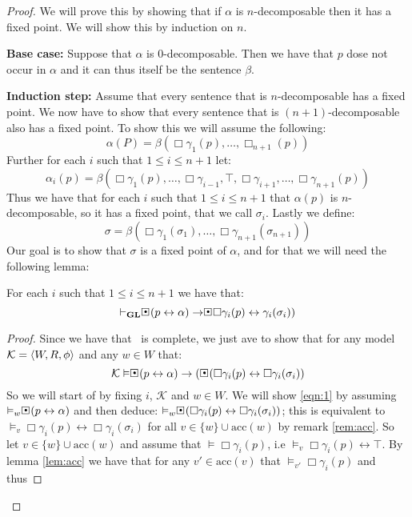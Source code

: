 \documentclass[../main.tex]{subfiles}
\begin{document}
\begin{proof}
	We will prove this by showing that if $\alpha$ is $n$-decomposable
	then it has a fixed point. We will show this by induction on $n$.

	\textbf{Base case:} Suppose that $\alpha$ is $0$-decomposable. Then we
	have that $p$ dose not occur in $\alpha$ and it can thus itself be the
	sentence $\beta$.

	\textbf{Induction step:}
	Assume that every sentence that is $n$-decomposable has a fixed point.
	We now have to show that every sentence that is $(n+1)$-decomposable
	also has a fixed point. To show this we will assume the following:
	$$\alpha(P)=\beta(\Box\gamma_1(p),\ldots,\Box_{n+1}(p))$$
	Further for each $i$ such that $1\leq i\leq n+1$ let:
	\[\alpha_i(p)=\beta(\Box\gamma_1(p),\ldots,\Box\gamma_{i-1},\top,\Box\gamma_{i+1},\ldots,\Box\gamma_{n+1}(p))\]
	Thus we have that for each $i$ such that $1\leq i\leq n+1$ that $\alpha(p)$ is $n$-decomposable,
	so it has a fixed point, that we call $\sigma_i$. Lastly we define:
	\[\sigma=\beta(\Box\gamma_1(\sigma_1),\ldots,\Box\gamma_{n+1}(\sigma_{n+1}))\]
	Our goal is to show that $\sigma$ is a fixed point of $\alpha$, and for
	that we will need the following lemma:
	\begin{lem}
		\label{lem:fix}
		For each $i$ such that $1\leq i\leq n+1$ we have that:
		$$\vdash_\GL\sBox(p\leftrightarrow\alpha)\rightarrow\sBox\Box\gamma_i(p)\leftrightarrow\gamma_i(\sigma_i))$$
	\end{lem}
	\begin{proof}
		Since we have that \GL\ is complete, we just ave to show that
		for any model $\mathcal{K}=\langle W,R,\phi\rangle$ and any $w\in W$
		that:
		\begin{equation}
		\label{eqn:1}
		\mathcal{K}\vDash\sBox(p\leftrightarrow\alpha)\rightarrow(\sBox(\Box\gamma_i(p)\leftrightarrow
		\Box\gamma_i(\sigma_i))
	\end{equation}
		So we will start of by fixing $i$, $\mathcal{K}$ and $w\in W$.
		We will show \ref{eqn:1} by assuming
		$\vDash_w\sBox(p\leftrightarrow\alpha)$ and then deduce:
		$\vDash_w\sBox(\Box\gamma_i(p)\leftrightarrow\Box\gamma_i(\sigma_i))$;
		this is equivalent to $\vDash_v\Box
		\gamma_i(p)\leftrightarrow\Box\gamma_i(\sigma_i)$ for all
		$v\in\{w\}\cup\text{acc}(w)$ by remark \ref{rem:acc}. So let
		$v\in\{w\}\cup\text{acc}(w)$ and assume that
		$\vDash\Box\gamma_i(p)$, i.e
		$\vDash_v\Box\gamma_i(p)\leftrightarrow\top$. By lemma
		\ref{lem:acc} we have that for any $v'\in\text{acc}(v)$ that
		$\vDash_{v'}\Box\gamma_i(p)$ and thus

\end{proof}
\end{proof}
\end{document}
